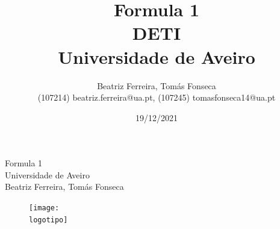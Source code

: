 \documentclass{report}
\begin{document}
%
\def\titulo{Formula 1}
\def\data{19/12/2021}
\def\autores{Beatriz Ferreira, Tomás Fonseca}
\def\autorescontactos{(107214) beatriz.ferreira@ua.pt, (107245) tomasfonseca14@ua.pt}
\def\departamento{DETI}
\def\empresa{Universidade de Aveiro}
\def\logotipo{ua.pdf}
%
%
\begin{titlepage}

\begin{center}
%
\vspace*{50mm}
%
{\Huge \titulo}\\ 
%
\vspace{10mm}
%
{\Large \empresa}\\
%
\vspace{10mm}
%
{\LARGE \autores}\\ 
%
\vspace{30mm}
%
\begin{figure}[h]
\center
\texttt{[image: \\logotipo]}
\end{figure}
%
\vspace{30mm}
\end{center}
%
\begin{flushright}
\end{flushright}
\end{titlepage}

\title{%
{\Huge\textbf{\titulo}}\\
{\Large \departamento\\ \empresa}
}
%
\author{%
    \autores \\
    \autorescontactos
}
%
\date{\data}
%
\maketitle

\end{document}
